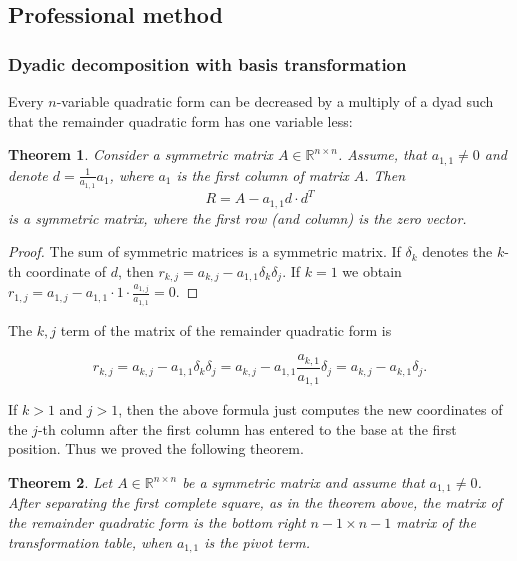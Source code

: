 \documentclass[aspectratio=169,notheorems]{corvinusmetropolis}
\newtheorem{theorem}{Theorem}
\theoremstyle{definition}
\begin{document}
\subsection{Professional method}
\begin{frame}
    \frametitle{Dyadic decomposition with basis transformation}
    Every $n$-variable quadratic form can be decreased by a multiply of a dyad such that
    the remainder quadratic form has one variable less:
    \begin{theorem}
        Consider a symmetric matrix $A\in\mathbb{R}^{n\times n}$.
        Assume, that $a_{1,1}\neq 0$ and denote $d=\frac{1}{a_{1,1}}a_1$,
        where $a_1$ is the first column of matrix $A$.
        Then 
        \[
            R=A-a_{1,1}d\cdot d^T
        \]
        is a symmetric matrix, where the first row (and column) is the zero vector.
    \end{theorem}
    \begin{proof}
        The sum of symmetric matrices is a symmetric matrix.
        If $\delta_k$ denotes the $k$-th coordinate of $d$, then
        \(
            r_{k,j}=
            a_{k,j}-a_{1,1}\delta_{k}\delta_j.
        \)
        If $k=1$ we obtain $r_{1,j}=a_{1,j}-a_{1,1}\cdot 1\cdot\frac{a_{1,j}}{a_{1,1}}=0$.
    \end{proof}
\end{frame}
\begin{frame}
    The $k,j$ term of the matrix of the remainder quadratic form is
    \begin{block}{}
    \[
        r_{k,j}=
        a_{k,j}-a_{1,1}\delta_k\delta_j=
        a_{k,j}-a_{1,1}\frac{a_{k,1}}{a_{1,1}}\delta_j=
        a_{k,j}-a_{k,1}\delta_j.
    \]
    \end{block}
    If $k>1$ and $j>1$, then the above formula just computes
    the new coordinates of the $j$-th column after the first column has entered to the base at the first position.
    Thus we proved the following theorem.
    \begin{theorem}
        Let $A\in\mathbb{R}^{n\times n}$ be a symmetric matrix and assume that $a_{1,1}\neq 0$.
        After separating the first complete square, as in the theorem above, the matrix of the remainder quadratic form
        is the bottom right $n-1\times n-1$ matrix of the transformation table, when $a_{1,1}$ is the pivot term.
    \end{theorem}
\end{frame}
\end{document}
